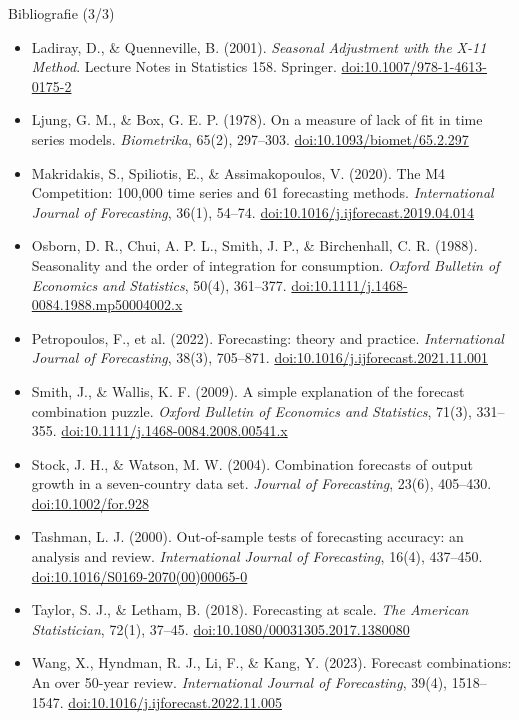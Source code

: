 \begin{frame}{Bibliografie (3/3)}
\itemsize{\scriptsize}
\begin{itemize}
    \item Ladiray, D., \& Quenneville, B. (2001). \textit{Seasonal Adjustment with the X-11 Method}. Lecture Notes in Statistics 158. Springer. \href{https://doi.org/10.1007/978-1-4613-0175-2}{doi:10.1007/978-1-4613-0175-2}
    \item Ljung, G. M., \& Box, G. E. P. (1978). On a measure of lack of fit in time series models. \textit{Biometrika}, 65(2), 297--303. \href{https://doi.org/10.1093/biomet/65.2.297}{doi:10.1093/biomet/65.2.297}
    \item Makridakis, S., Spiliotis, E., \& Assimakopoulos, V. (2020). The M4 Competition: 100,000 time series and 61 forecasting methods. \textit{International Journal of Forecasting}, 36(1), 54--74. \href{https://doi.org/10.1016/j.ijforecast.2019.04.014}{doi:10.1016/j.ijforecast.2019.04.014}
    \item Osborn, D. R., Chui, A. P. L., Smith, J. P., \& Birchenhall, C. R. (1988). Seasonality and the order of integration for consumption. \textit{Oxford Bulletin of Economics and Statistics}, 50(4), 361--377. \href{https://doi.org/10.1111/j.1468-0084.1988.mp50004002.x}{doi:10.1111/j.1468-0084.1988.mp50004002.x}
    \item Petropoulos, F., et al. (2022). Forecasting: theory and practice. \textit{International Journal of Forecasting}, 38(3), 705--871. \href{https://doi.org/10.1016/j.ijforecast.2021.11.001}{doi:10.1016/j.ijforecast.2021.11.001}
    \item Smith, J., \& Wallis, K. F. (2009). A simple explanation of the forecast combination puzzle. \textit{Oxford Bulletin of Economics and Statistics}, 71(3), 331--355. \href{https://doi.org/10.1111/j.1468-0084.2008.00541.x}{doi:10.1111/j.1468-0084.2008.00541.x}
    \item Stock, J. H., \& Watson, M. W. (2004). Combination forecasts of output growth in a seven-country data set. \textit{Journal of Forecasting}, 23(6), 405--430. \href{https://doi.org/10.1002/for.928}{doi:10.1002/for.928}
    \item Tashman, L. J. (2000). Out-of-sample tests of forecasting accuracy: an analysis and review. \textit{International Journal of Forecasting}, 16(4), 437--450. \href{https://doi.org/10.1016/S0169-2070(00)00065-0}{doi:10.1016/S0169-2070(00)00065-0}
    \item Taylor, S. J., \& Letham, B. (2018). Forecasting at scale. \textit{The American Statistician}, 72(1), 37--45. \href{https://doi.org/10.1080/00031305.2017.1380080}{doi:10.1080/00031305.2017.1380080}
    \item Wang, X., Hyndman, R. J., Li, F., \& Kang, Y. (2023). Forecast combinations: An over 50-year review. \textit{International Journal of Forecasting}, 39(4), 1518--1547. \href{https://doi.org/10.1016/j.ijforecast.2022.11.005}{doi:10.1016/j.ijforecast.2022.11.005}
\end{itemize}
\end{frame}


